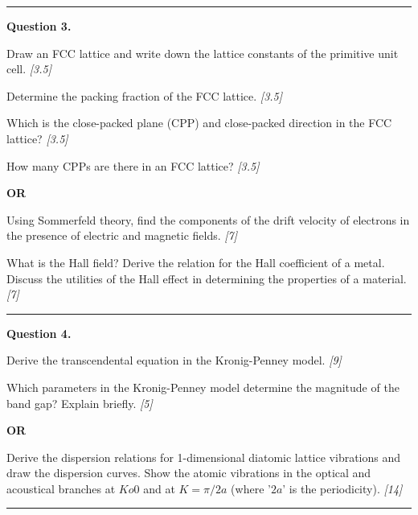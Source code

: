\documentclass[11pt,a4paper]{article}
\newcommand{\pts}[1]{\hfill   \textit{[#1]}}
\begin{document}
\medskip\rule{\linewidth}{0.2pt}




\noindent   \textbf{Question 3.}

\begin{parts}
  \item Draw an FCC lattice and write down the lattice constants of the primitive unit cell. \pts{3.5}
  \item Determine the packing fraction of the FCC lattice. \pts{3.5}
  \item Which is the close-packed plane (CPP) and close-packed direction in the FCC lattice? \pts{3.5}
  \item How many CPPs are there in an FCC lattice? \pts{3.5}
\end{parts}
\hfill   \textbf{OR}

\begin{parts}
  \item Using Sommerfeld theory, find the components of the drift velocity of electrons in the presence of electric and magnetic fields. \pts{7}
  \item What is the Hall field? Derive the relation for the Hall coefficient of a metal. Discuss the utilities of the Hall effect in determining the properties of a material. \pts{7}
\end{parts}

\medskip\rule{\linewidth}{0.2pt}




\noindent   \textbf{Question 4.}

\begin{parts}
  \item Derive the transcendental equation in the Kronig-Penney model. \pts{9}
  \item Which parameters in the Kronig-Penney model determine the magnitude of the band gap? Explain briefly. \pts{5}
\end{parts}
\hfill   \textbf{OR}

\begin{parts}
  \item Derive the dispersion relations for 1-dimensional diatomic lattice vibrations and draw the dispersion curves. Show the atomic vibrations in the optical and acoustical branches at $K  o 0$ and at $K = \pi/2a$ (where '$2a$' is the periodicity). \pts{14}
\end{parts}

\medskip\rule{\linewidth}{0.2pt}
\end{document}

